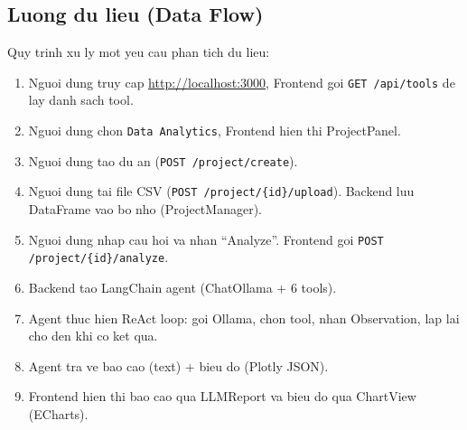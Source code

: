 \documentclass[12pt,a4paper]{article}
\begin{document}
\begin{center}
\end{center}

\subsection{Luong du lieu (Data Flow)}

Quy trinh xu ly mot yeu cau phan tich du lieu:

\begin{enumerate}
  \item Nguoi dung truy cap \url{http://localhost:3000}, Frontend goi
        \texttt{GET /api/tools} de lay danh sach tool.
  \item Nguoi dung chon \texttt{Data Analytics}, Frontend hien thi ProjectPanel.
  \item Nguoi dung tao du an (\texttt{POST /project/create}).
  \item Nguoi dung tai file CSV (\texttt{POST /project/\{id\}/upload}).
        Backend luu DataFrame vao bo nho (ProjectManager).
  \item Nguoi dung nhap cau hoi va nhan ``Analyze''.
        Frontend goi \texttt{POST /project/\{id\}/analyze}.
  \item Backend tao LangChain agent (ChatOllama + 6 tools).
  \item Agent thuc hien ReAct loop: goi Ollama, chon tool, nhan Observation,
        lap lai cho den khi co ket qua.
  \item Agent tra ve bao cao (text) + bieu do (Plotly JSON).
  \item Frontend hien thi bao cao qua LLMReport va bieu do qua ChartView
        (ECharts).
\end{enumerate}
\end{document}
